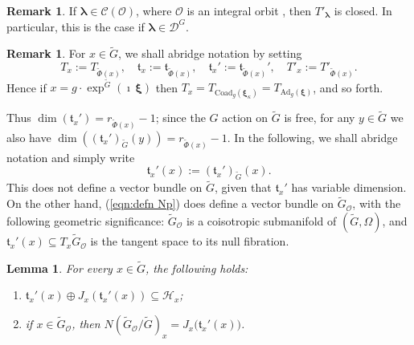 \documentclass[12pt,a4paper]{article}
\theoremstyle{plain}
\newtheorem{lem}[thm]{Lemma}%
\theoremstyle{definition}
\newtheorem{rem}[thm]{Remark}%
\begin{document}
\begin{rem}
If $\boldsymbol{\lambda}\in 
\mathcal{C}(\mathcal{O})$, where $\mathcal{O}$ is an integral orbit
\cite{gstb82}, then $T'_{\boldsymbol{\lambda}}$ is closed. In particular, 
this is the
case if $\boldsymbol{\lambda}\in \mathcal{D}^G$.
\end{rem}

\begin{rem}
\label{rem:tlambda'}
For $x\in \tilde{G}$, we shall abridge notation by
setting
$$T_x:=T_{\tilde{\Phi}(x)},\quad \mathfrak{t}_x:=
\mathfrak{t}_{\tilde{\Phi}(x)},
\quad
\mathfrak{t}_x':=\mathfrak{t}_{\tilde{\Phi}(x)}',\quad
T'_x:=T'_{\tilde{\Phi}(x)}.
$$
Hence if $x=g\cdot\exp^{\tilde{G}}(\imath\,\boldsymbol{\xi})$ then
$T_x=T_{\mathrm{Coad}_g(\boldsymbol{\xi}_\kappa)}=
T_{\mathrm{Ad}_g(\boldsymbol{\xi})}$, and so forth.
\end{rem}

Thus $\dim (\mathfrak{t}_x')=r_{\tilde{\Phi}(x)}-1$; since the
$G$ action on $\tilde{G}$ is free, for any $y\in \tilde{G}$ we also have
$\dim \left(
(\mathfrak{t}_x')_{\tilde{G}}(y)\right)=r_{\tilde{\Phi}(x)}-1$.
In the following, we shall abridge notation and simply
write 
\begin{equation}
\label{eqn:defn Np}
\mathfrak{t}_x'(x):=(\mathfrak{t}_x')_{\tilde{G}}(x).
\end{equation}
%
%
This does not define a vector bundle on $\tilde{G}$, given that 
$\mathfrak{t}_x'$ has
variable dimension.
On the other hand,
(\ref{eqn:defn Np}) does define a vector bundle on $\tilde{G}_{\mathcal{O}}$, with the following geometric significance: 
$\tilde{G}_{\mathcal{O}}$ is a coisotropic submanifold of $(\tilde{G},\Omega)$, and 
$\mathfrak{t}_x'(x)\subseteq T_x\tilde{G}_{\mathcal{O}}$
is the tangent space to its null fibration.


\begin{lem}
\label{lem:normal bundle GO}
For every $x\in \tilde{G}$, 
the following holds:
\begin{enumerate}
\item $\mathfrak{t}_x'(x)\oplus 
J_x\left( \mathfrak{t}_x'(x) \right)\subseteq \mathcal{H}_x$;
\item if $x\in \tilde{G}_{\mathcal{O}}$, then
$N(\tilde{G}_{\mathcal{O}}/\tilde{G})_x=
J_x\big(\mathfrak{t}_x'(x)\big)$.
\end{enumerate}

\end{lem}
\end{document}
